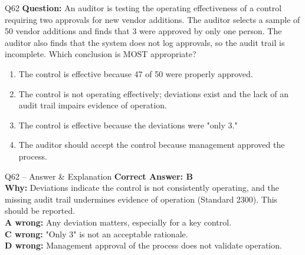 \documentclass[aspectratio=169,10pt]{beamer}
\begin{document}
	\begin{frame}[t]{Q62}
		\small
		\textbf{Question:} An auditor is testing the operating effectiveness of a control requiring two approvals for new vendor additions. The auditor selects a sample of 50 vendor additions and finds that 3 were approved by only one person. The auditor also finds that the system does not log approvals, so the audit trail is incomplete. Which conclusion is MOST appropriate?
		\begin{enumerate}[label=\Alph*.,itemsep=1pt,topsep=2pt]
			\item The control is effective because 47 of 50 were properly approved.
			\item The control is not operating effectively; deviations exist and the lack of an audit trail impairs evidence of operation.
			\item The control is effective because the deviations were "only 3."
			\item The auditor should accept the control because management approved the process.
		\end{enumerate}
	\end{frame}
	
	\begin{frame}[t]{Q62 -- Answer \& Explanation}
		\small
		\textbf{Correct Answer: B} \\[4pt]
		\textbf{Why:} Deviations indicate the control is not consistently operating, and the missing audit trail undermines evidence of operation (Standard 2300). This should be reported. \\[4pt]
		\textbf{A wrong:} Any deviation matters, especially for a key control. \\[2pt]
		\textbf{C wrong:} "Only 3" is not an acceptable rationale. \\[2pt]
		\textbf{D wrong:} Management approval of the process does not validate operation.
	\end{frame}
	
\end{document}
